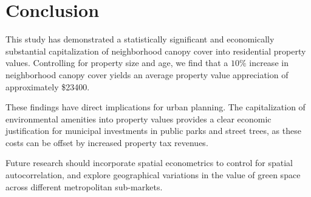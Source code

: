 \section{Conclusion}
This study has demonstrated a statistically significant and economically substantial capitalization of neighborhood canopy cover into residential property values. Controlling for property size and age, we find that a $10\%$ increase in neighborhood canopy cover yields an average property value appreciation of approximately \$\num{23400}. 

These findings have direct implications for urban planning. The capitalization of environmental amenities into property values provides a clear economic justification for municipal investments in public parks and street trees, as these costs can be offset by increased property tax revenues. 

Future research should incorporate spatial econometrics to control for spatial autocorrelation, and explore geographical variations in the value of green space across different metropolitan sub-markets.
